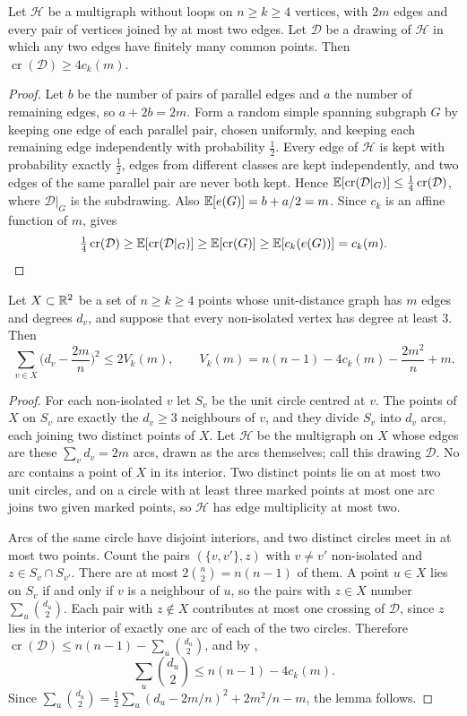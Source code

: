 \documentclass[11pt,colorlinks]{charlie}
\newcommand{\cro}{\operatorname{cr}}
\begin{document}
\begin{lemma}[Halving]\label{lem:halving}
Let $\mathcal H$ be a multigraph without loops on $n\ge k\ge4$ vertices, with $2m$ edges and every pair of vertices joined by at most two edges. Let $\mathcal D$ be a drawing of $\mathcal H$ in which any two edges have finitely many common points. Then $\cro(\mathcal D)\ge4c_k(m)$.
\end{lemma}

\begin{proof}
Let $b$ be the number of pairs of parallel edges and $a$ the number of remaining edges, so $a+2b=2m$. Form a random simple spanning subgraph $G$ by keeping one edge of each parallel pair, chosen uniformly, and keeping each remaining edge independently with probability $\tfrac12$. Every edge of $\mathcal H$ is kept with probability exactly $\tfrac12$, edges from different classes are kept independently, and two edges of the same parallel pair are never both kept. Hence $\E[\cro(\mathcal D|_G)]\le\tfrac14\cro(\mathcal D)$, where $\mathcal D|_G$ is the subdrawing. Also $\mathbb{E}[e(G)]=b+a/2=m$. Since $c_k$ is an affine function of $m$,  gives
\[
 \tfrac14\cro(\mathcal D)\ge\E[\cro(\mathcal D|_G)]\ge\E[\cro(G)]\ge\E[c_k(e(G))]=c_k(m).\qedhere
\]
\end{proof}

\begin{lemma}\label{lem:variance}
Let $X\subset\mathbb{R}^2$ be a set of $n\ge k\ge4$ points whose unit-distance graph has $m$ edges and degrees $d_v$, and suppose that every non-isolated vertex has degree at least $3$. Then
\[
 \sum_{v\in X}\Big(d_v-\frac{2m}{n}\Big)^2\le2V_k(m),\qquad V_k(m)=n(n-1)-4c_k(m)-\frac{2m^2}{n}+m .
\]
\end{lemma}

\begin{proof}
For each non-isolated $v$ let $S_v$ be the unit circle centred at $v$. The points of $X$ on $S_v$ are exactly the $d_v\ge3$ neighbours of $v$, and they divide $S_v$ into $d_v$ arcs, each joining two distinct points of $X$. Let $\mathcal H$ be the multigraph on $X$ whose edges are these $\sum_vd_v=2m$ arcs, drawn as the arcs themselves; call this drawing $\mathcal D$. No arc contains a point of $X$ in its interior. Two distinct points lie on at most two unit circles, and on a circle with at least three marked points at most one arc joins two given marked points, so $\mathcal H$ has edge multiplicity at most two.

Arcs of the same circle have disjoint interiors, and two distinct circles meet in at most two points. Count the pairs $(\{v,v'\},z)$ with $v\ne v'$ non-isolated and $z\in S_v\cap S_{v'}$. There are at most $2\binom n2=n(n-1)$ of them. A point $u\in X$ lies on $S_v$ if and only if $v$ is a neighbour of $u$, so the pairs with $z\in X$ number $\sum_u\binom{d_u}{2}$. Each pair with $z\notin X$ contributes at most one crossing of $\mathcal D$, since $z$ lies in the interior of exactly one arc of each of the two circles. Therefore $\cro(\mathcal D)\le n(n-1)-\sum_u\binom{d_u}2$, and by ,
\[
 \sum_u\binom{d_u}{2}\le n(n-1)-4c_k(m).
\]
Since $\sum_u\binom{d_u}2=\tfrac12\sum_u(d_u-2m/n)^2+2m^2/n-m$, the lemma follows.
\end{proof}
\end{document}
